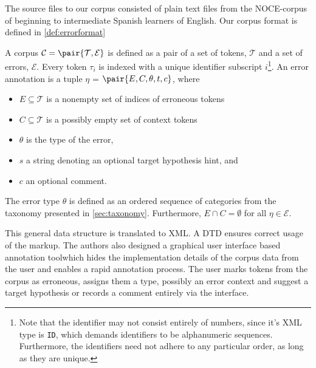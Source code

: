 \documentclass[12pt]{scrartcl}
\begin{document}
The source files to our corpus consisted of plain text files from the
NOCE-corpus %
of beginning to intermediate Spanish learners of English. Our corpus
format is defined in \ref{def:errorformat}

\begin{definition}\label{def:errorformat}

A corpus $\mathcal{C}=\pair{\mathcal{T},\mathcal{E}}$ is defined as a pair of
a set of tokens, $\mathcal{T}$ and a 
set of errors, $\mathcal{E}$. Every token $\tau_i$ is indexed with a unique
identifier subscript $i$\footnote{Note that the identifier may not consist entirely of
numbers, since it's XML type is \texttt{ID}, which demands identifiers to be
alphanumeric sequences. Furthermore, the identifiers need not adhere to any
particular order, as long as they are unique.}.
An error annotation is a tuple $\eta$ = $\pair{E,C,\theta,t,c}$, where
\begin{itemize}
  \item $E \subseteq \mathcal{T}$ is a nonempty set of indices of erroneous tokens
  \item $C \subseteq \mathcal{T}$ is a possibly empty set of context tokens
  \item $\theta$ is the type of the error,
  \item $s$ a string denoting an optional target hypothesis hint, and
  \item $c$ an optional comment.
\end{itemize}

The error type $\theta$ is defined as an ordered sequence of categories from the
taxonomy presented in \ref{sec:taxonomy}. Furthermore, $E \cap C = \emptyset$
for all $\eta\in\mathcal{E}$.

\end{definition}

This general data structure is translated to XML. A DTD ensures correct usage of
the markup. The authors also designed a graphical user interface based
annotation tool\footnotemark which hides the implementation details of the
corpus data from the user and enables a rapid annotation process. The user marks
tokens from the corpus as erroneous, assigns them a type, possibly an error
context and suggest a target hypothesis or records a comment entirely via the
interface.


\end{document}
